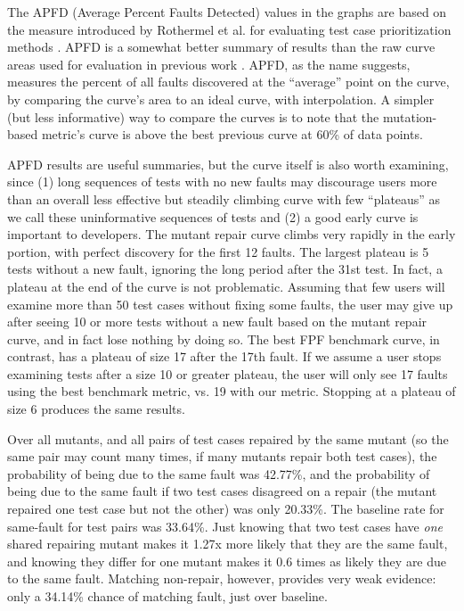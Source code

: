 The APFD (Average Percent Faults Detected) values in the graphs are based on the measure  introduced by Rothermel et al. for evaluating test case prioritization methods \cite{APFD}.  APFD is a somewhat better summary of results than the raw curve areas used for evaluation in previous work \cite{PLDI13}.  APFD, as the name suggests, measures the percent of all faults discovered at the ``average'' point on the curve, by comparing the curve's area to an ideal curve, with interpolation.  A simpler (but less informative) way to compare the curves is to note that the mutation-based metric's curve is above the best previous curve at 60\% of data points.

APFD results are useful summaries, but the curve itself is also worth examining, since (1) long sequences of tests with no new faults may discourage users more than an overall less effective but steadily climbing curve with few ``plateaus'' as we call these uninformative sequences of tests and (2) a good early curve is important to developers.  The mutant repair curve climbs very rapidly in the early portion, with perfect discovery for the first 12 faults. The largest plateau is 5 tests without a new fault, ignoring the long period after the 31st test.  In fact, a plateau at the end of the curve is not problematic.  Assuming that few users will examine more than 50 test cases without fixing some faults, the user may give up after seeing 10 or more tests without a new fault based on the mutant repair curve, and in fact lose nothing by doing so.  The best FPF benchmark curve, in contrast, has a plateau of size 17 after the 17th fault.  If we assume a user stops examining tests after a size 10 or greater plateau, the user will only see 17 faults using the best benchmark metric, vs. 19 with our metric.  Stopping at a plateau of size 6 produces the same results.

Over all mutants, and all pairs of test cases repaired by the same mutant (so the same pair may count many times, if many mutants repair both test cases), the probability of being due to the same fault was 42.77\%, and the probability of being due to the same fault if two test cases disagreed on a repair (the mutant repaired one test case but not the other) was only 20.33\%.  The baseline rate for same-fault for test pairs was 33.64\%.  Just knowing that two test cases have \emph{one} shared repairing mutant makes it 1.27x more likely that they are the same fault, and knowing they differ for one mutant makes it 0.6 times as likely they are due to the same fault.  Matching non-repair, however, provides very weak evidence:  only a 34.14\% chance of matching fault, just over baseline.

